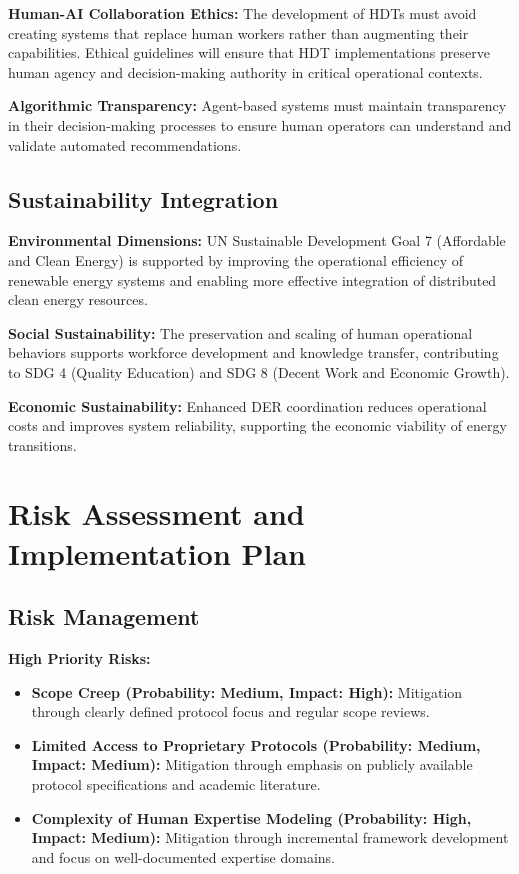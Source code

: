 \documentclass[12pt,a4paper]{article}
\begin{document}
\noindent \textbf{Human-AI Collaboration Ethics:} The development of HDTs must avoid creating systems that replace human workers rather than augmenting their capabilities. Ethical guidelines will ensure that HDT implementations preserve human agency and decision-making authority in critical operational contexts.

\noindent \textbf{Algorithmic Transparency:} Agent-based systems must maintain transparency in their decision-making processes to ensure human operators can understand and validate automated recommendations.

\subsection{Sustainability Integration}

\noindent \textbf{Environmental Dimensions:} UN Sustainable Development Goal 7 (Affordable and Clean Energy) is supported by improving the operational efficiency of renewable energy systems and enabling more effective integration of distributed clean energy resources.

\noindent \textbf{Social Sustainability:} The preservation and scaling of human operational behaviors supports workforce development and knowledge transfer, contributing to SDG 4 (Quality Education) and SDG 8 (Decent Work and Economic Growth).

\noindent \textbf{Economic Sustainability:} Enhanced DER coordination reduces operational costs and improves system reliability, supporting the economic viability of energy transitions.

\section{Risk Assessment and Implementation Plan}
\label{sec:risks}

\subsection{Risk Management}

\noindent \textbf{High Priority Risks:}
\begin{itemize}
\item \textbf{Scope Creep (Probability: Medium, Impact: High):} Mitigation through clearly defined protocol focus and regular scope reviews.
\item \textbf{Limited Access to Proprietary Protocols (Probability: Medium, Impact: Medium):} Mitigation through emphasis on publicly available protocol specifications and academic literature.
\item \textbf{Complexity of Human Expertise Modeling (Probability: High, Impact: Medium):} Mitigation through incremental framework development and focus on well-documented expertise domains.
\end{itemize}
\end{document}
